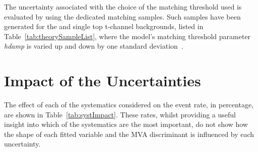 The uncertainty associated with the choice of the matching threshold used is evaluated by using the dedicated matching samples.
Such samples have been generated for the \ttbar and single top t-channel backgrounds, listed in Table~\ref{tab:theorySampleList}, where the model's matching threshold parameter \emph{hdamp} is varied up and down by one standard deviation~\cite{CMS:2016kle}.

\section{Impact of the Uncertainties}\label{sec:uncertainitiesImpact}
The effect of each of the systematics considered on the event rate, in percentage, are shown in Table~\ref{tab:systImpact}.
These rates, whilst providing a useful insight into which of the systematics are the most important, do not show how the shape of each fitted variable and the MVA discriminant is influenced by each uncertainty.


